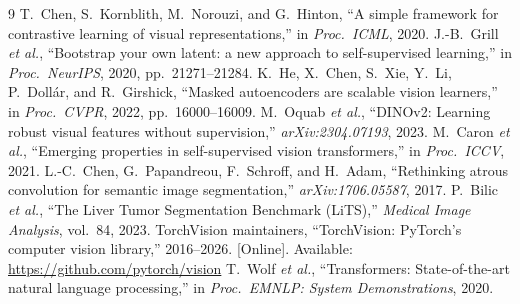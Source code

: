 \documentclass[conference]{IEEEtran}
\begin{document}
\begin{thebibliography}{9}
 T.~Chen, S.~Kornblith, M.~Norouzi, and G.~Hinton,
``A simple framework for contrastive learning of visual representations,''
in \emph{Proc.\ ICML}, 2020.
 J.-B.~Grill \emph{et al.},
``Bootstrap your own latent: a new approach to self-supervised learning,''
in \emph{Proc.\ NeurIPS}, 2020, pp.\ 21271--21284.
 K.~He, X.~Chen, S.~Xie, Y.~Li, P.~Doll\'ar, and R.~Girshick,
``Masked autoencoders are scalable vision learners,''
in \emph{Proc.\ CVPR}, 2022, pp.\ 16000--16009.
 M.~Oquab \emph{et al.},
``DINOv2: Learning robust visual features without supervision,''
\emph{arXiv:2304.07193}, 2023.
 M.~Caron \emph{et al.},
``Emerging properties in self-supervised vision transformers,''
in \emph{Proc.\ ICCV}, 2021.
 L.-C.~Chen, G.~Papandreou, F.~Schroff, and H.~Adam,
``Rethinking atrous convolution for semantic image segmentation,''
\emph{arXiv:1706.05587}, 2017.
 P.~Bilic \emph{et al.},
``The Liver Tumor Segmentation Benchmark (LiTS),''
\emph{Medical Image Analysis}, vol.~84, 2023.
 TorchVision maintainers,
``TorchVision: PyTorch's computer vision library,'' 2016--2026. [Online].
Available: \url{https://github.com/pytorch/vision}
 T.~Wolf \emph{et al.},
``Transformers: State-of-the-art natural language processing,''
in \emph{Proc.\ EMNLP: System Demonstrations}, 2020.
\end{thebibliography}
\end{document}
